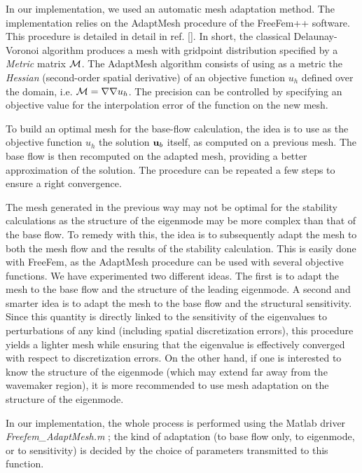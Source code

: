 \documentclass[twocolumn,10pt]{asme2ej}
\begin{document}
In our implementation, we used an automatic mesh adaptation method. %
The implementation relies on the AdaptMesh procedure of the FreeFem++ software. This procedure is detailed in detail in ref. []. In short, 
the classical Delaunay-Voronoi algorithm produces a mesh with gridpoint distribution specified by a {\em Metric } matrix $\cal M$. The AdaptMesh algorithm consists of using as a metric the {\em Hessian} (second-order spatial derivative) of an objective function $u_h$ defined over the domain, i.e. ${\cal M} = \nabla \nabla u_h$. The precision can be controlled by specifying an objective value for the interpolation error of the function on the new mesh.

To build an optimal mesh for the base-flow calculation, the idea is to use as the objective function $u_h$ the solution ${\bf u}_b$ itself, as computed on a previous mesh.%
The base flow is then recomputed on the adapted mesh, providing a better approximation of the solution. The procedure can be repeated a few steps to ensure a right convergence.

The mesh generated in the previous way may not be optimal for the stability calculations as the structure of the eigenmode may be more complex than that of the base flow. To remedy with this, the idea is to subsequently adapt the mesh to both the mesh flow and the results of the stability calculation. This is easily done with FreeFem, as the  AdaptMesh procedure can be used with several objective functions. We have experimented two different ideas. The first is to adapt the mesh to the base flow and the structure of the leading eigenmode. A second and smarter idea is to adapt the mesh to the base flow and the structural sensitivity. Since this quantity is directly linked to the sensitivity of the eigenvalues to perturbations of any kind (including spatial discretization errors), this procedure yields a lighter mesh while ensuring that the eigenvalue is effectively converged with respect to discretization errors. 
On the other hand, if one is interested to know the structure of the eigenmode (which may extend far away from the wavemaker region), it is more recommended to use mesh adaptation on the structure of the eigenmode.

In our implementation, the whole process is performed using the Matlab driver {\em Freefem\_AdaptMesh.m} ; the kind of adaptation (to base flow only, to eigenmode, or to sensitivity) is decided by the choice of parameters transmitted to this function.
\end{document}
